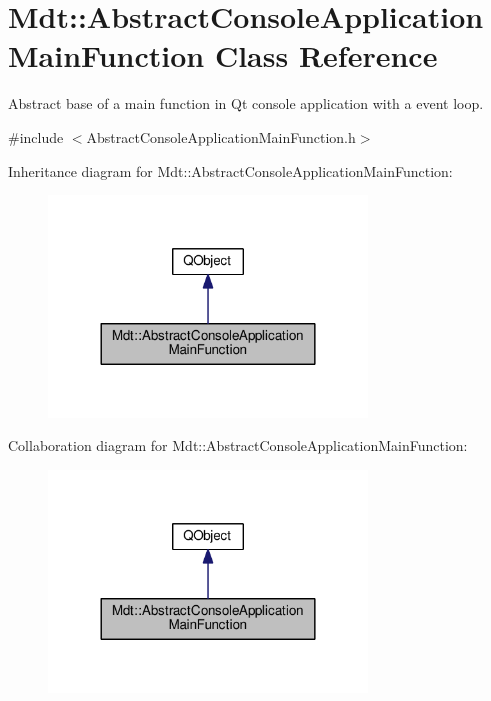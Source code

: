 \hypertarget{class_mdt_1_1_abstract_console_application_main_function}{}\section{Mdt\+:\+:Abstract\+Console\+Application\+Main\+Function Class Reference}
\label{class_mdt_1_1_abstract_console_application_main_function}


Abstract base of a main function in Qt console application with a event loop.  




{\ttfamily \#include $<$Abstract\+Console\+Application\+Main\+Function.\+h$>$}



Inheritance diagram for Mdt\+:\+:Abstract\+Console\+Application\+Main\+Function\+:\nopagebreak
\begin{figure}[H]
\begin{center}
\leavevmode
\includegraphics[width=240pt]{class_mdt_1_1_abstract_console_application_main_function__inherit__graph}
\end{center}
\end{figure}


Collaboration diagram for Mdt\+:\+:Abstract\+Console\+Application\+Main\+Function\+:\nopagebreak
\begin{figure}[H]
\begin{center}
\leavevmode
\includegraphics[width=240pt]{class_mdt_1_1_abstract_console_application_main_function__coll__graph}
\end{center}
\end{figure}
